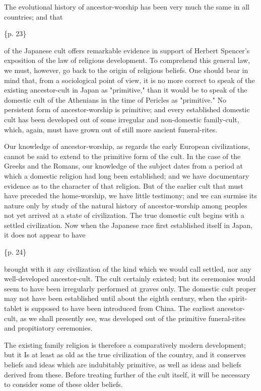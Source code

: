 The evolutional history of ancestor-worship has been very much the same in all countries; and that

\{p. 23\}

of the Japanese cult offers remarkable evidence in support of Herbert Spencer's exposition of the law of religious development. To comprehend this general law, we must, however, go back to the origin of religious beliefs. One should bear in mind that, from a sociological point of view, it is no more correct to speak of the existing ancestor-cult in Japan as "primitive," than it would be to speak of the domestic cult of the Athenians in the time of Pericles as "primitive." No persistent form of ancestor-worship is primitive; and every established domestic cult has been developed out of some irregular and non-domestic family-cult, which, again, must have grown out of still more ancient funeral-rites.

Our knowledge of ancestor-worship, as regards the early European civilizations, cannot be said to extend to the primitive form of the cult. In the case of the Greeks and the Romans, our knowledge of the subject dates from a period at which a domestic religion had long been established; and we have documentary evidence as to the character of that religion. But of the earlier cult that must have preceded the home-worship, we have little testimony; and we can surmise its nature only by study of the natural history of ancestor-worship among peoples not yet arrived at a state of civilization. The true domestic cult begins with a settled civilization. Now when the Japanese race first established itself in Japan, it does not appear to have

\{p. 24\}

brought with it any civilization of the kind which we would call settled, nor any well-developed ancestor-cult. The cult certainly existed; but its ceremonies would seem to have been irregularly performed at graves only. The domestic cult proper may not have been established until about the eighth century, when the spirit-tablet is supposed to have been introduced from China. The earliest ancestor-cult, as we shall presently see, was developed out of the primitive funeral-rites and propitiatory ceremonies.

The existing family religion is therefore a comparatively modern development; but it Is at least as old as the true civilization of the country, and it conserves beliefs and ideas which are indubitably primitive, as well as ideas and beliefs derived from these. Before treating further of the cult itself, it will be necessary to consider some of these older beliefs.



